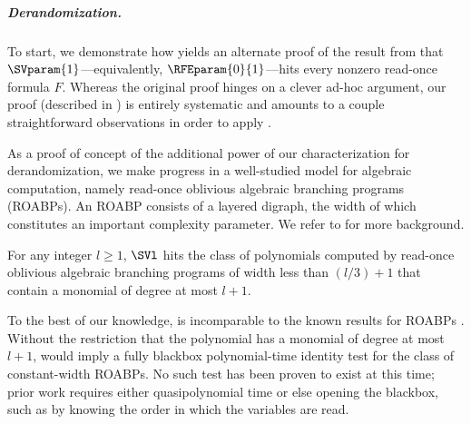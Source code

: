 \subparagraph{Derandomization.}
To start,
we demonstrate how  yields an alternate
proof of the result from \cite{MinahanVolkovich2017}
that \(\SVparam{1}\)---equivalently, \(\RFEparam{0}{1}\)---hits
every nonzero read-once formula $F$.
Whereas the original proof hinges on a clever ad-hoc argument,
our proof (described in  ) is entirely systematic and amounts to
a couple straightforward observations in order to apply
.

As a proof of concept of the additional power of our characterization for derandomization,
we make progress in a well-studied model for algebraic computation, namely read-once oblivious algebraic
branching programs (ROABPs). An ROABP consists of a layered digraph, the width of which constitutes an important complexity parameter. We refer to  for more background.

\begin{theorem}\label{thm.roabp}
  For any integer $l \ge 1$, $\SVl$ hits the class of polynomials computed by
  read-once oblivious algebraic branching programs of width less than
  $(l/3)+1$ that contain a monomial of degree at most $l+1$.
\end{theorem}
To the best of our knowledge,
 is incomparable to the known results for ROABPs
\cite{RazShpilka2005,JQS2009,JQS2010,ForbesShpilka2013,FSS2014,AGKS2014,AFSSV2015,GKST2015,GKS2016,GuoGurjar2020,SahaThankey2021,BhargavaGhosh2021}.
Without the restriction that the polynomial has a monomial of degree at most
\(l+1\),
 would imply a fully blackbox polynomial-time identity test
for the class of constant-width ROABPs.
No such test has been proven to exist at this time;
prior work requires either quasipolynomial time or else opening the
blackbox,
such as by knowing the order in which the variables are read.

